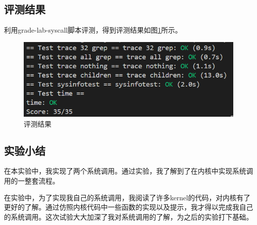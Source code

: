 \subsection{评测结果}
利用grade-lab-syscall脚本评测，得到评测结果如图\ref{fig:syscall}所示。
\begin{figure}[h]
    \centering
    \includegraphics[width=\linewidth]{pics/syscall评测结果.png}
    \caption{评测结果}
    \label{fig:syscall}
\end{figure}

\subsection{实验小结}

在本实验中，我实现了两个系统调用。通过实验，我了解到了在内核中实现系统调用的一整套流程。

在实验中，为了实现我自己的系统调用，我阅读了许多kernel的代码，对内核有了更好的了解。通过仿照内核代码中一些函数的实现以及提示，我才得以完成我自己的系统调用。这次试验大大加深了我对系统调用的了解，为之后的实验打下基础。
